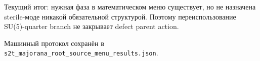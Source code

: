 Текущий итог: нужная фаза в математическом меню существует, но не назначена
sterile-моде никакой обязательной структурой. Поэтому переиспользование
SU(5)-quarter branch не закрывает defect parent action.

Машинный протокол сохранён в
\texttt{s2t\_majorana\_root\_source\_menu\_results.json}.